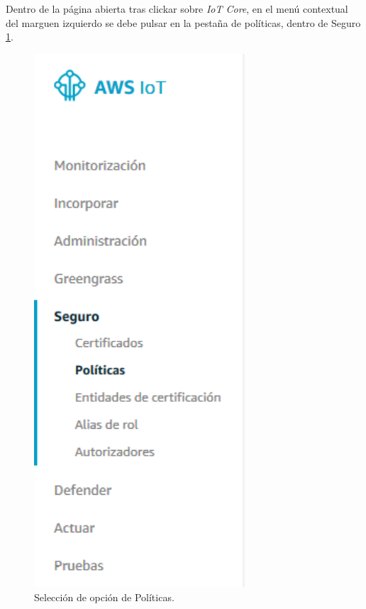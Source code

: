 \documentclass[english,runningheads,a4paper]{llncs}[2018/03/10]
\begin{document}
Dentro de la página abierta tras clickar sobre \textit{IoT Core}, en el menú
contextual del marguen izquierdo se debe pulsar en la pestaña de políticas, 
dentro de Seguro \hyperref[policies]{\ref{policies}}.

\begin{figure}[h!]
 \centering
 \includegraphics[width=0.7\textwidth]{./IoT/AWS/1-3_politics.png}
 \caption{Selección de opción de Políticas.}
 \label{policies}
\end{figure}
\end{document}

